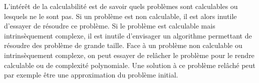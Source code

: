 L'intérêt de la calculabilité est de savoir quels problèmes sont calculables ou lesquels ne le sont pas. Si un problème est non calculable, il est alors inutile  d'essayer de résoudre ce problème.  Si le problème est calculable mais intrinsèquement complexe, il est inutile d'envisager un algorithme permettant de résoudre des problème de grande taille.
Face à un problème non calculable ou intrinsèquement complexe, on peut essayer de relâcher le problème pour le rendre calculable ou de complexité polynomiale. Une solution à ce problème relâché peut par exemple être une approximation du problème initial.
